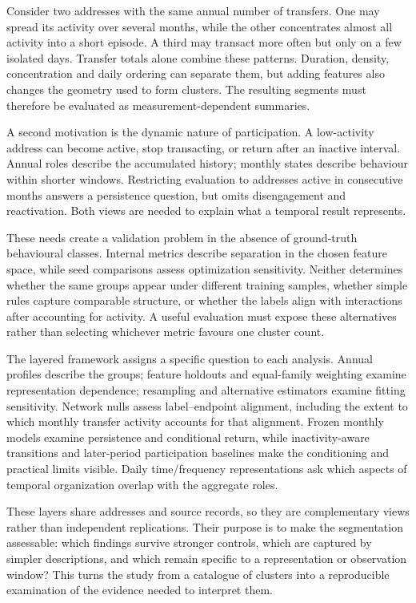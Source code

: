 \documentclass[journal,letterpaper]{IEEEtran}
\begin{document}
Consider two addresses with the same annual number of transfers. One may spread its activity over several months, while the other concentrates almost all activity into a short episode. A third may transact more often but only on a few isolated days. Transfer totals alone combine these patterns. Duration, density, concentration and daily ordering can separate them, but adding features also changes the geometry used to form clusters. The resulting segments must therefore be evaluated as measurement-dependent summaries.

A second motivation is the dynamic nature of participation. A low-activity address can become active, stop transacting, or return after an inactive interval. Annual roles describe the accumulated history; monthly states describe behaviour within shorter windows. Restricting evaluation to addresses active in consecutive months answers a persistence question, but omits disengagement and reactivation. Both views are needed to explain what a temporal result represents.

These needs create a validation problem in the absence of ground-truth behavioural classes. Internal metrics describe separation in the chosen feature space, while seed comparisons assess optimization sensitivity. Neither determines whether the same groups appear under different training samples, whether simple rules capture comparable structure, or whether the labels align with interactions after accounting for activity. A useful evaluation must expose these alternatives rather than selecting whichever metric favours one cluster count.

The layered framework assigns a specific question to each analysis. Annual profiles describe the groups; feature holdouts and equal-family weighting examine representation dependence; resampling and alternative estimators examine fitting sensitivity. Network nulls assess label--endpoint alignment, including the extent to which monthly transfer activity accounts for that alignment. Frozen monthly models examine persistence and conditional return, while inactivity-aware transitions and later-period participation baselines make the conditioning and practical limits visible. Daily time/frequency representations ask which aspects of temporal organization overlap with the aggregate roles.

These layers share addresses and source records, so they are complementary views rather than independent replications. Their purpose is to make the segmentation assessable: which findings survive stronger controls, which are captured by simpler descriptions, and which remain specific to a representation or observation window? This turns the study from a catalogue of clusters into a reproducible examination of the evidence needed to interpret them.
\end{document}
